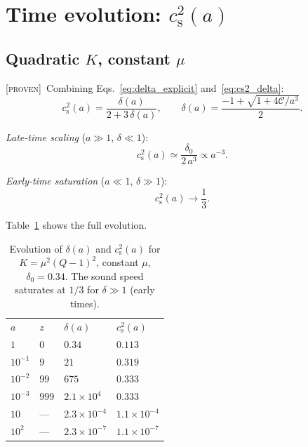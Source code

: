 \documentclass[prd,twocolumn,superscriptaddress,longbibliography,floatfix]{revtex4-2}
\newcommand{\cs}{c_{\mathrm{s}}}
\newcommand{\proven}{\textsc{[proven]}}
\begin{document}
\section{Time evolution: $\cs^2(a)$}
\label{sec:cs2_of_a}

\subsection{Quadratic $K$, constant $\mu$}
\label{sec:case1}

\proven\ Combining Eqs.~\eqref{eq:delta_explicit}
and~\eqref{eq:cs2_delta}:
\begin{equation}
\cs^2(a) = \frac{\delta(a)}{2 + 3\,\delta(a)},
\qquad
\delta(a) = \frac{-1+\sqrt{1+4\mathcal{C}/a^3}}{2}.
\label{eq:cs2_a_quad}
\end{equation}

\emph{Late-time scaling} ($a \gg 1$, $\delta \ll 1$):
\begin{equation}
\cs^2(a) \simeq \frac{\delta_0}{2\,a^3}
\propto a^{-3}.
\label{eq:cs2_late}
\end{equation}

\emph{Early-time saturation} ($a \ll 1$, $\delta \gg 1$):
\begin{equation}
\cs^2(a) \to \frac{1}{3}.
\label{eq:cs2_early}
\end{equation}

Table~\ref{tab:cs2_evolution} shows the full evolution.

\begin{table}[b]
\caption{\label{tab:cs2_evolution}%
Evolution of $\delta(a)$ and $\cs^2(a)$ for
$K = \mu^2(Q{-}1)^2$, constant $\mu$,
$\delta_0 = 0.34$.  The sound speed saturates at
$1/3$ for $\delta \gg 1$ (early times).}
\begin{ruledtabular}
\begin{tabular}{llll}
$a$ & $z$ & $\delta(a)$ & $\cs^2(a)$ \\
\colrule
$1$       & $0$    & $0.34$       & $0.113$  \\
$10^{-1}$ & $9$    & $21$         & $0.319$  \\
$10^{-2}$ & $99$   & $675$        & $0.333$  \\
$10^{-3}$ & $999$  & $2.1\times10^4$ & $0.333$  \\
$10$      & ---    & $2.3\times10^{-4}$ & $1.1\times10^{-4}$  \\
$10^2$    & ---    & $2.3\times10^{-7}$ & $1.1\times10^{-7}$  \\
\end{tabular}
\end{ruledtabular}
\end{table}
\end{document}
